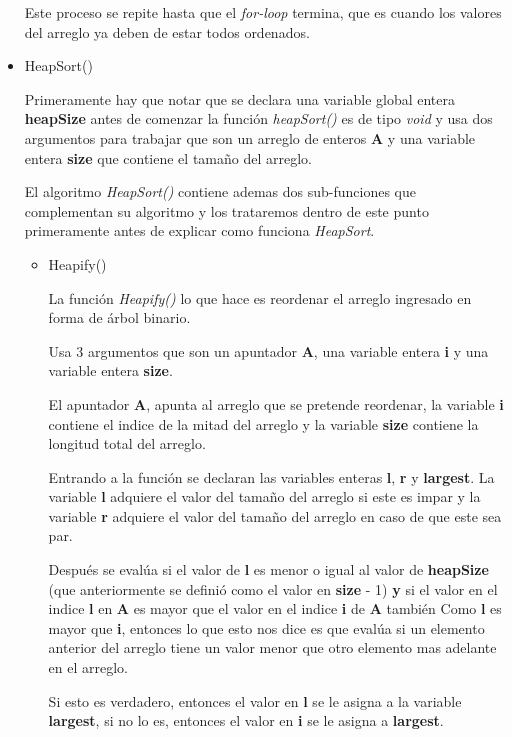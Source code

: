 \documentclass{article}
\begin{document}
\begin{itemize}
				Este proceso se repite hasta que el \emph{for-loop} termina, que es cuando los valores del arreglo ya deben de estar todos ordenados.
				
				
				\item HeapSort()
				
				Primeramente hay que notar que se declara una variable global entera \textbf{heapSize} antes de comenzar la función \emph{heapSort()} es de tipo \emph{void} y usa dos argumentos para trabajar que son un arreglo de enteros \textbf{A} y una variable entera \textbf{size} que contiene el tamaño del arreglo.
				
				El algoritmo \emph{HeapSort()} contiene ademas dos sub-funciones que complementan su algoritmo y los trataremos dentro de este punto primeramente antes de explicar como funciona \emph{HeapSort}.
				
				\begin{itemize}
					\item Heapify()
					
					La función \emph{Heapify()} lo que hace es reordenar el arreglo ingresado en forma de árbol binario.
					
					Usa 3 argumentos que son un apuntador \textbf{A}, una variable entera \textbf{i} y una variable entera \textbf{size}.
					
					El apuntador \textbf{A}, apunta al arreglo que se pretende reordenar, la variable \textbf{i} contiene el indice de la mitad del arreglo y la variable \textbf{size} contiene la longitud total del arreglo.
					
					Entrando a la función se declaran las variables enteras \textbf{l}, \textbf{r} y \textbf{largest}. La variable \textbf{l} adquiere el valor del tamaño del arreglo si este es impar y la variable \textbf{r} adquiere el valor del tamaño del arreglo en caso de que este sea par.
					
					Después se evalúa si el valor de \textbf{l} es menor o igual al valor de \textbf{heapSize} (que anteriormente se definió como el valor en \textbf{size} - 1) \textbf{y} si el valor en el indice \textbf{l} en \textbf{A} es mayor que el valor en el indice \textbf{i} de \textbf{A} también Como \textbf{l} es mayor que \textbf{i}, entonces lo que esto nos dice es que evalúa si un elemento anterior del arreglo tiene un valor menor que otro elemento mas adelante en el arreglo.
					
					Si esto es verdadero, entonces el valor en \textbf{l} se le asigna a la variable \textbf{largest}, si no lo es, entonces el valor en \textbf{i} se le asigna a \textbf{largest}.
					

\end{itemize}
\end{itemize}
\end{document}
